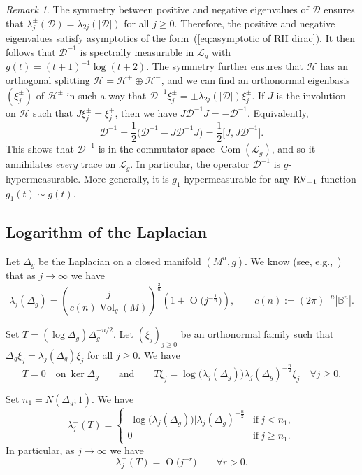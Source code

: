 \documentclass[10pt, a4paper]{amsart}
\newcommand{\bB}{\mathbb{B}}
\newcommand{\sD}{\mathscr{D}}
\newcommand{\sL}{\mathscr{L}}
\newcommand{\sH}{\mathscr{H}}
\newcommand{\op}{\operatorname}
\newcommand{\Vol}{\op{Vol}}
\newcommand{\Com}{\op{Com}}
\numberwithin{equation}{section}
\theoremstyle{definition}
\theoremstyle{remark}
\newtheorem{remark}[theorem]{Remark}
\newcommand{\RV}{\textup{RV}}
\begin{document}
\begin{remark}
 The symmetry between positive and negative eigenvalues of $\sD$ ensures that $\lambda_j^\pm(\sD)=\lambda_{2j}(|\sD|)$ for all $j\geq 0$. Therefore, the positive and negative eigenvalues satisfy asymptotics of the form~(\ref{eq:asymptotic of RH dirac}). It then follows that $\sD^{-1}$ is spectrally measurable in $\sL_g$ with $g(t)=(t+1)^{-1}\log (t+2)$. The symmetry further ensures that $\sH$ has an orthogonal splitting $\sH=\sH^+\oplus \sH^-$, and we can find an orthonormal eigenbasis $(\xi_j^\pm)$ of $\sH^{\pm}$ in such a way that
 $\sD^{-1}\xi_j^\pm =\pm \lambda_{2j}(|\sD|)\xi_j^\pm$. If $J$ is the involution on $\sH$ such that $J\xi_j^\pm=\xi_j^\mp$, then we have $J\sD^{-1}J=-\sD^{-1}$. Equivalently,
 \begin{equation*}
 \sD^{-1}= \frac{1}{2}\big(\sD^{-1}-J\sD^{-1}J\big)= \frac12\big[J,J\sD^{-1}\big].
\end{equation*}
This shows that $\sD^{-1}$ is in the commutator space $\Com(\sL_g)$, and so it annihilates \emph{every} trace on $\sL_g$. In particular, the operator $\sD^{-1}$ is $g$-hypermeasurable. More generally, it is $g_1$-hypermeasurable for any $\RV_{-1}$-function $g_1(t)\sim g(t)$.
\end{remark}

\subsection{Logarithm of the Laplacian}
Let $\Delta_g$ be the Laplacian on a closed manifold $(M^n,g)$. We know (see, e.g.,~\cite{Ho:ActaM68}) that as $j\rightarrow \infty$ we have
\begin{equation}\label{eq:eigenvalue of Delta_g}
  \lambda_j\left(\Delta_g\right)= \left(\frac{j}{c(n)\Vol_g(M)}\right)^{\frac{2}{n}}\left(1 +\op{O}\big(j^{-\frac1{n}}\big)\right), \qquad c(n):=(2\pi)^{-n}|\bB^n|.
\end{equation}

Set $T= (\log \Delta_g)\Delta_g^{-n/2}$. Let $(\xi_j)_{j\geq 0}$ be an orthonormal family such that $\Delta_g\xi_j=\lambda_j(\Delta_g)\xi_j$ for all $j\geq 0$. We have
\begin{equation*}
T=0 \quad \text{on}\ \ker \Delta_g \qquad \text{and} \qquad T\xi_j=\log\big( \lambda_j(\Delta_g)\big)\lambda_j(\Delta_g)^{-\frac{n}{2}}\xi_j \quad \forall j\geq 0.
\end{equation*}

Set $n_1=N(\Delta_g;1)$. We have
\begin{equation*}
 \lambda_j^{-}(T)= \left\{
 \begin{array}{cl}
 \big|\log\big( \lambda_{j}(\Delta_g)\big)\big|\lambda_{j}(\Delta_g)^{-\frac{n}{2}}
 & \text{if}\ j <n_1,\\
 0 & \text{if}\ j\geq n_1.
\end{array}\right.
\end{equation*}
In particular, as $j\rightarrow \infty$ we have
\begin{equation*}
 \lambda_j^{-}(T) = \op{O}\big(j^{-r}\big) \qquad \forall r>0.
\end{equation*}
\end{document}

